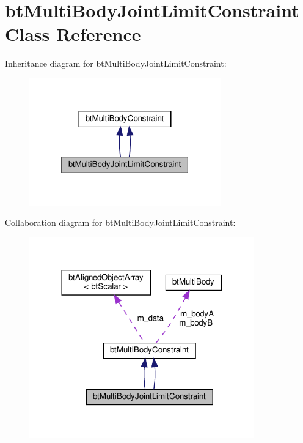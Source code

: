 \hypertarget{classbtMultiBodyJointLimitConstraint}{}\section{bt\+Multi\+Body\+Joint\+Limit\+Constraint Class Reference}
\label{classbtMultiBodyJointLimitConstraint}


Inheritance diagram for bt\+Multi\+Body\+Joint\+Limit\+Constraint\+:
\nopagebreak
\begin{figure}[H]
\begin{center}
\leavevmode
\includegraphics[width=235pt]{classbtMultiBodyJointLimitConstraint__inherit__graph}
\end{center}
\end{figure}


Collaboration diagram for bt\+Multi\+Body\+Joint\+Limit\+Constraint\+:
\nopagebreak
\begin{figure}[H]
\begin{center}
\leavevmode
\includegraphics[width=276pt]{classbtMultiBodyJointLimitConstraint__coll__graph}
\end{center}
\end{figure}
